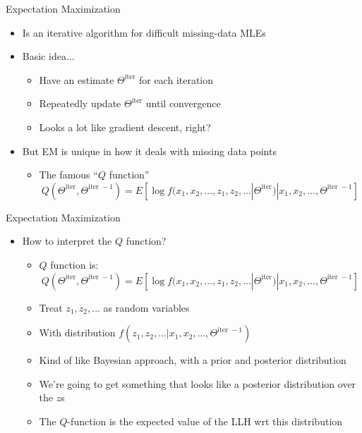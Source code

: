 \documentclass[aspectratio=169]{beamer}
\begin{document}
\begin{frame}{Expectation Maximization}

\begin{itemize}
\item Is an iterative algorithm for difficult missing-data MLEs
\item Basic idea...
	\begin{itemize}
	\item Have an estimate $\Theta^{\textrm{iter}}$ for each iteration
	\item Repeatedly update $\Theta^{\textrm{iter}}$ until convergence
	\item Looks a lot like gradient descent, right?
	\end{itemize}
\item But EM is unique in how it deals with missing data points
	\begin{itemize}
	\item The famous ``$Q$ function''
	$$Q(\Theta^{\textrm{iter}}, \Theta^{\textrm{iter }-1}) = E \left[ \log f (x_1, x_2, ..., z_1, z_2, ... | \Theta^{\textrm{iter}}) |
			x_1,  x_2, ..., \Theta^{\textrm{iter }-1} \right]$$
	\end{itemize}
\end{itemize}
\end{frame}
\begin{frame}{Expectation Maximization}

\begin{itemize}
\item How to interpret the $Q$ function?
	\begin{itemize}
	\item $Q$ function is:
	$$Q(\Theta^{\textrm{iter}}, \Theta^{\textrm{iter }-1}) = E \left[ \log f (x_1, x_2, ..., z_1, z_2, ... | \Theta^{\textrm{iter}}) |
			x_1,  x_2, ..., \Theta^{\textrm{iter }-1} \right]$$
	\item Treat $z_1, z_2, ...$ as random variables
	\item With distribution $f (z_1, z_2, ... | x_1,  x_2, ..., \Theta^{\textrm{iter }-1})$
	\item Kind of like Bayesian approach, with a prior and posterior distribution
	\item We're going to get something that looks like a posterior distribution over the $z$s
	\item The $Q$-function is the expected value of the LLH wrt this distribution
	\end{itemize}
\end{itemize}

\end{frame}
\end{document}
